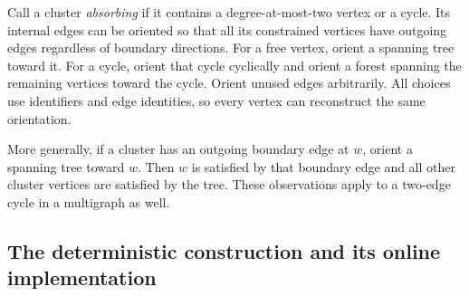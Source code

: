 \documentclass[11pt]{article}
\theoremstyle{definition}
\begin{document}
Call a cluster \emph{absorbing} if it contains a degree-at-most-two vertex
or a cycle. Its internal edges can be oriented so that all its constrained
vertices have outgoing edges regardless of boundary directions. For a free
vertex, orient a spanning tree toward it. For a cycle, orient that cycle
cyclically and orient a forest spanning the remaining vertices toward the
cycle. Orient unused edges arbitrarily. All choices use identifiers and
edge identities, so every vertex can reconstruct the same orientation.

More generally, if a cluster has an outgoing boundary edge at $w$, orient a
spanning tree toward $w$. Then $w$ is satisfied by that boundary edge and
all other cluster vertices are satisfied by the tree. These observations
apply to a two-edge cycle in a multigraph as well.

\subsection{The deterministic construction and its online implementation}
\end{document}
